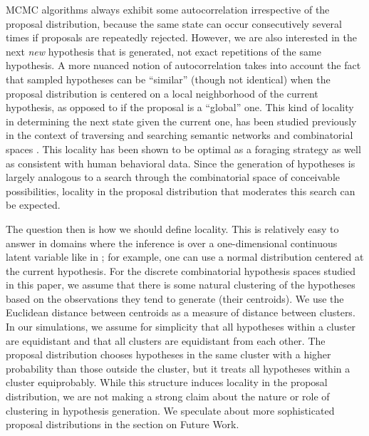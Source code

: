 MCMC algorithms always exhibit some autocorrelation irrespective of the proposal distribution, because the same state can occur consecutively several times if proposals are repeatedly rejected. However, we are also interested in the next \textit{new} hypothesis that is generated, not exact repetitions of the same hypothesis. A more nuanced notion of autocorrelation  takes into account the fact that sampled hypotheses can be ``similar'' (though not identical) when the proposal distribution is centered on a local neighborhood of the current hypothesis, as opposed to if the proposal is a ``global'' one. This kind of locality in determining the next state given the current one, has been studied previously in the context of traversing and searching semantic networks \citep{abbott2015random} and combinatorial spaces \citep{smith2013multiply}. This locality has been shown to be optimal as a foraging strategy \citep{hills2012optimal} as well as consistent with human behavioral data. Since the generation of hypotheses is largely analogous to a search through the combinatorial space of conceivable possibilities, locality in the proposal distribution that moderates this search can be expected.

The question then is how we should define locality. This is relatively easy to answer in domains where the inference is over a one-dimensional continuous latent variable like in \cite{Lieder2013}; for example, one can use a normal distribution centered at the current hypothesis. For the discrete combinatorial hypothesis spaces studied in this paper, we assume that there is some natural clustering of the hypotheses based on the observations they tend to generate (their centroids). We use the Euclidean distance between centroids as a measure of distance between clusters. In our simulations, we assume for simplicity that all hypotheses within a cluster are equidistant and that all clusters are equidistant from each other. The proposal distribution chooses hypotheses in the same cluster with a higher probability than those outside the cluster, but it treats all hypotheses within a cluster equiprobably. While this structure induces locality in the proposal distribution, we are not making a strong claim about the nature or role of clustering in hypothesis generation. We speculate about more sophisticated proposal distributions in the section on Future Work. 


